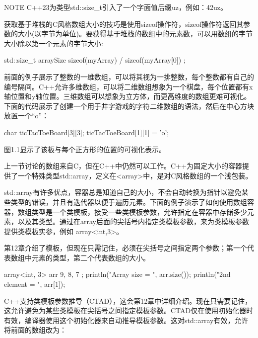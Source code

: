 \begin{myNotic}{NOTE}
C++23为类型std::size\_t引入了一个字面值后缀uz，例如：42uz。
\end{myNotic}

获取基于堆栈的C风格数组大小的技巧是使用sizeof操作符，sizeof操作符返回其参数的大小(以字节为单位)。要获得基于堆栈的数组中的元素数，可以用数组的字节大小除以第一个元素的字节大小:

\begin{cpp}
std::size_t arraySize { sizeof(myArray) / sizeof(myArray[0]) };
\end{cpp}

前面的例子展示了整数的一维数组，可以将其视为一排整数，每个整数都有自己的编号隔间。C++允许多维数组，可以将二维数组想象为一个棋盘，每个位置都有x轴位置和y轴位置。三维数组可以想象为立方体，而更高维度的数组更难可视化。下面的代码展示了创建一个用于井字游戏的字符二维数组的语法，然后在中心方块放置一个“o”：

\begin{cpp}
char ticTacToeBoard[3][3];
ticTacToeBoard[1][1] = 'o';
\end{cpp}

图1.1显示了该板与每个正方形的位置的可视化表示。



上一节讨论的数组来自C，但在C++中仍然可以工作。C++为固定大小的容器提供了一个特殊类型std::array，定义在<array>中，是对C风格数组的一个浅包装。

std::array有许多优点，容器总是知道自己的大小，不会自动转换为指针以避免某些类型的错误，并且有迭代器以便于遍历元素。下面的例子演示了如何使用数组容器，数组类型是一个类模板，接受一些类模板参数，允许指定在容器中存储多少元素，以及其类型。通过在array后面的尖括号内指定类模板参数，来为类模板参数提供类模板实参，例如 array<int,3>。

第12章介绍了模板，但现在只需记住，必须在尖括号之间指定两个参数；第一个代表数组中元素的类型，第二个代表数组的大小。

\begin{cpp}
array<int, 3> arr { 9, 8, 7 };
println("Array size = {}", arr.size());
println("2nd element = {}", arr[1]);
\end{cpp}

C++支持类模板参数推导（CTAD），这会第12章中详细介绍。现在只需要记住，这允许避免为某些类模板在尖括号之间指定模板参数。CTAD仅在使用初始化器时有效，编译器使用这个初始化器来自动推导模板参数。这对std::array有效，允许将前面的数组改为：


